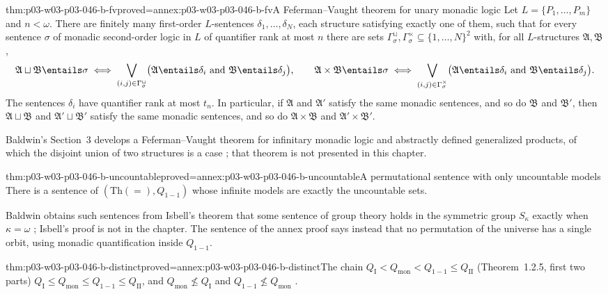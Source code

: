 \begin{hblemma}{thm:p03-w03-p03-046-b-fv}{proved=annex:p03-w03-p03-046-b-fv}{A Feferman--Vaught theorem for unary monadic logic}
Let \(L=\{P_1,\dots,P_m\}\) and \(n<\omega\). There are finitely many
first-order \(L\)-sentences \(\delta_1,\dots,\delta_N\), each structure
satisfying exactly one of them, such that for every sentence \(\sigma\) of
monadic second-order logic in \(L\) of quantifier rank at most \(n\) there
are sets \(\Gamma^\sqcup_\sigma,\Gamma^\times_\sigma\subseteq\{1,\dots,N\}^2\)
with, for all \(L\)-structures \(\mathfrak A,\mathfrak B\),
\[
\mathfrak A\sqcup\mathfrak B\entails\sigma\iff
\bigvee_{(i,j)\in\Gamma^\sqcup_\sigma}\bigl(\mathfrak A\entails\delta_i
\text{ and }\mathfrak B\entails\delta_j\bigr),
\qquad
\mathfrak A\times\mathfrak B\entails\sigma\iff
\bigvee_{(i,j)\in\Gamma^\times_\sigma}\bigl(\mathfrak A\entails\delta_i
\text{ and }\mathfrak B\entails\delta_j\bigr).
\]
The sentences \(\delta_i\) have quantifier rank at most \(t_n\). In
particular, if \(\mathfrak A\) and \(\mathfrak A'\) satisfy the same
monadic sentences, and so do \(\mathfrak B\) and \(\mathfrak B'\), then
\(\mathfrak A\sqcup\mathfrak B\) and \(\mathfrak A'\sqcup\mathfrak B'\)
satisfy the same monadic sentences, and so do \(\mathfrak A\times\mathfrak
B\) and \(\mathfrak A'\times\mathfrak B'\).
\end{hblemma}

Baldwin's Section~3 develops a Feferman--Vaught theorem for infinitary
monadic logic and abstractly defined generalized products, of which the
disjoint union of two structures is a case \cite[pp.~466, 468]{Baldwin1985DSOQ};
that theorem is not presented in this chapter.

\begin{hblemma}{thm:p03-w03-p03-046-b-uncountable}{proved=annex:p03-w03-p03-046-b-uncountable}{A permutational sentence with only uncountable models}
There is a sentence of \((\mathrm{Th}(=),Q_{1-1})\) whose infinite models
are exactly the uncountable sets.
\end{hblemma}

Baldwin obtains such sentences from Isbell's theorem that some sentence of
group theory holds in the symmetric group \(S_\kappa\) exactly when
\(\kappa=\omega\) \cite[pp.~445, 449]{Baldwin1985DSOQ}; Isbell's proof is not
in the chapter. The sentence of the annex proof says instead that no
permutation of the universe has a single orbit, using monadic
quantification inside \(Q_{1-1}\).

\begin{hbtheorem}{thm:p03-w03-p03-046-b-distinct}{proved=annex:p03-w03-p03-046-b-distinct}{The chain \(Q_{\mathrm I}<Q_{\mathrm{mon}}<Q_{1-1}\le Q_{\mathrm{II}}\) (Theorem~1.2.5, first two parts)}
\(Q_{\mathrm I}\le Q_{\mathrm{mon}}\le Q_{1-1}\le Q_{\mathrm{II}}\), and
\(Q_{\mathrm{mon}}\not\le Q_{\mathrm I}\) and
\(Q_{1-1}\not\le Q_{\mathrm{mon}}\)
\cite[p.~449, Theorem~1.2.5]{Baldwin1985DSOQ}.
\end{hbtheorem}

